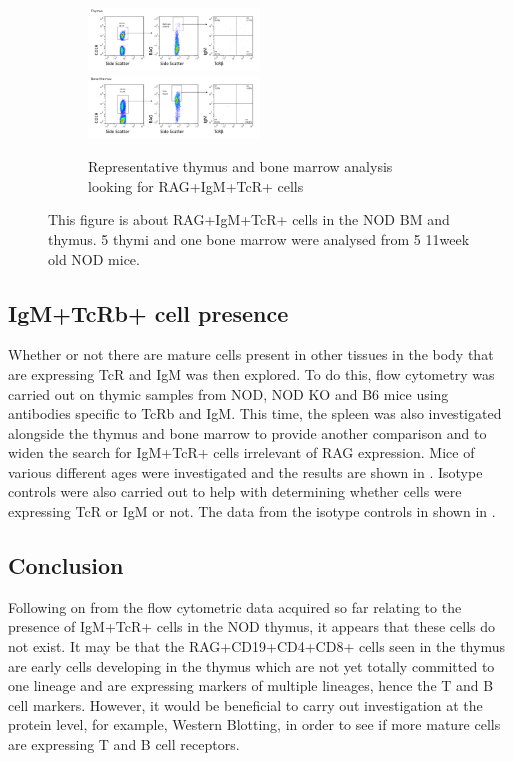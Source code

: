 \begin{figure}
	\begin{subfigure}{\textwidth}
	\includegraphics[width=0.5\textwidth]{Figures/Thy3RAGIgMTcR.png}
	\includegraphics[width=0.5\textwidth]{Figures/BMRAGIgMTcR.png}
	\caption{Representative thymus and bone marrow analysis looking for RAG+IgM+TcR+ cells}
	\label{subfig:BMvThyRAGIgMTcR}
	\end{subfigure}
\caption{This figure is about RAG+IgM+TcR+ cells in the NOD BM and thymus. 5 thymi and one bone marrow were analysed from 5 11week old NOD mice.}
\label{fig:RAGIgMTcRpos}
\end{figure}


\subsection{IgM+TcRb+ cell presence}

Whether or not there are mature cells present in other tissues in the body that are expressing TcR and IgM was then explored.
To do this, flow cytometry was carried out on thymic samples from NOD, NOD KO and B6 mice using antibodies specific to TcRb and IgM.
This time, the spleen was also investigated alongside the thymus and bone marrow to provide another comparison and to widen the search for IgM+TcR+ cells irrelevant of RAG expression.
Mice of various different ages were investigated and the results are shown in  .
Isotype controls were also carried out to help with determining whether cells were expressing TcR or IgM or not.
The data from the isotype controls in shown in .



\subsection{Conclusion}
Following on from the flow cytometric data acquired so far relating to the presence of IgM+TcR+ cells in the NOD thymus, it appears that these cells do not exist. 
It may be that the RAG+CD19+CD4+CD8+ cells seen in the thymus are early cells developing in the thymus which are not yet totally committed to one lineage and are expressing markers of multiple lineages, hence the T and B cell markers.
However, it would be beneficial to carry out investigation at the protein level, for example, Western Blotting, in order to see if more mature cells are expressing T and B cell receptors.




